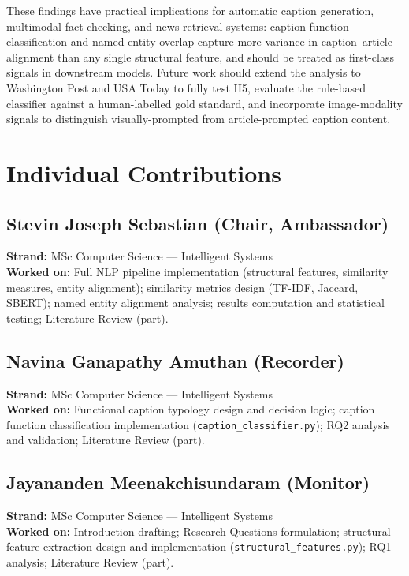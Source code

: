 \documentclass[11pt,a4paper]{article}
\begin{document}
These findings have practical implications for automatic caption
generation, multimodal fact-checking, and news retrieval systems: caption
function classification and named-entity overlap capture more variance in
caption--article alignment than any single structural feature, and should
be treated as first-class signals in downstream models. Future work should
extend the analysis to Washington Post and USA Today to fully test H5,
evaluate the rule-based classifier against a human-labelled gold standard,
and incorporate image-modality signals to distinguish visually-prompted
from article-prompted caption content.




\appendix
\section*{Individual Contributions}

\subsection*{Stevin Joseph Sebastian (Chair, Ambassador)}
\textbf{Strand:} MSc Computer Science --- Intelligent Systems\\
\textbf{Worked on:} Full NLP pipeline implementation (structural features,
similarity measures, entity alignment); similarity metrics design
(TF-IDF, Jaccard, SBERT); named entity alignment analysis; results
computation and statistical testing; Literature Review (part).

\vspace{0.5cm}

\subsection*{Navina Ganapathy Amuthan (Recorder)}
\textbf{Strand:} MSc Computer Science --- Intelligent Systems\\
\textbf{Worked on:} Functional caption typology design and decision logic;
caption function classification implementation
(\texttt{caption\_classifier.py}); RQ2 analysis and validation; Literature
Review (part).

\vspace{0.5cm}

\subsection*{Jayananden Meenakchisundaram (Monitor)}
\textbf{Strand:} MSc Computer Science --- Intelligent Systems\\
\textbf{Worked on:} Introduction drafting; Research Questions formulation;
structural feature extraction design and implementation
(\texttt{structural\_features.py}); RQ1 analysis; Literature Review (part).
\end{document}
